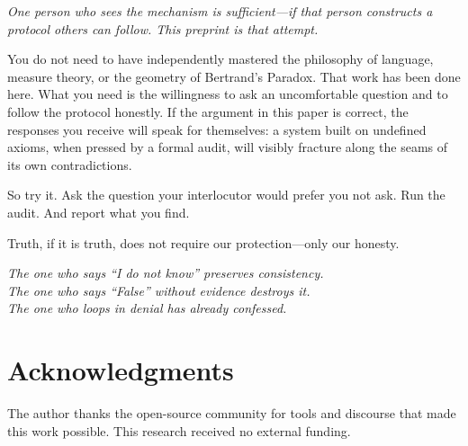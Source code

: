 \documentclass[11pt,a4paper]{article}
\theoremstyle{definition}
\theoremstyle{plain}
\theoremstyle{remark}
\begin{document}
\bigskip
\begin{center}
\begin{minipage}{0.88\textwidth}
\small\itshape
One person who sees the mechanism is sufficient---if that person constructs
a protocol others can follow.
This preprint is that attempt.

You do not need to have independently mastered the philosophy of language,
measure theory, or the geometry of Bertrand's Paradox.
That work has been done here.
What you need is the willingness to ask an uncomfortable question and to
follow the protocol honestly.
If the argument in this paper is correct, the responses you receive will
speak for themselves: a system built on undefined axioms, when pressed
by a formal audit, will visibly fracture along the seams of its own
contradictions.

So try it.
Ask the question your interlocutor would prefer you not ask.
Run the audit.
And report what you find.

Truth, if it is truth, does not require our protection---only our honesty.
\end{minipage}
\end{center}
\bigskip


\vspace{0.5cm}
\begin{center}
\textit{The one who says ``I do not know'' preserves consistency.\\
The one who says ``False'' without evidence destroys it.\\
The one who loops in denial has already confessed.}
\end{center}


\section*{Acknowledgments}

The author thanks the open-source community for tools and discourse that made this work possible. This research received no external funding.
\end{document}
